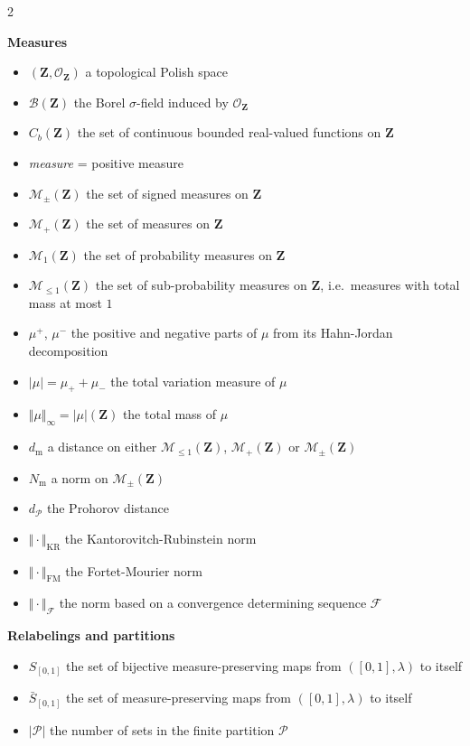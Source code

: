 \documentclass{amsart}
\newcommand{\ie}{i.e.\ }
\theoremstyle{plain}
\theoremstyle{definition}
\newcommand{\Space}{\mathbf{Z}}
\newcommand{\Topo}{\mathcal{O}_\Space}
\newcommand{\Borel}{\mathcal{B}(\Space)}
\newcommand{\cP}{\mathcal{P}}
\newcommand{\Proba}{\mathcal{M}_1(\Space)}
\newcommand{\SubProba}{\mathcal{M}_{\leq1}(\Space)}
\newcommand{\Meas}{\mathcal{M}_+(\Space)}
\newcommand{\SignedMeas}{\mathcal{M}_{\pm}(\Space)}
\newcommand{\CbFunct}{C_b(\Space)}
\newcommand{\TM}[1]{\norm{#1}_\infty}
\newcommand{\InvRelabel}{S_{[0,1]}}
\newcommand{\Relabel}{\bar{S}_{[0,1]}}
\newcommand{\m}{\mathrm{m}}
\newcommand{\dmeas}{d_\m}
\newcommand{\NmeasSymbol}{N_\m}
\newcommand{\NmeasFSymbol}{\Vert\cdot\Vert_{\mathcal{F}}}
\newcommand{\F}{\mathcal{F}}
\newcommand{\dmeasP}{d_{\mathcal{P}}}
\newcommand{\mKR}{\text{KR}}
\newcommand{\NmeasKRSymbol}{\Vert\cdot\Vert_{\mKR}}
\newcommand{\mFM}{\text{FM}}
\newcommand{\NmeasFMSymbol}{\Vert\cdot\Vert_{\mFM}}
\newcommand{\norm}[1]{\Vert#1\Vert}
\begin{document}
\renewcommand\labelitemi{-}
\setlength{\columnseprule}{1pt}
\begin{multicols}{2}
\noindent
\hrulefill

\begin{center}
   \textbf{Measures}
\end{center}
\begin{itemize}[leftmargin=*,itemsep=0.5em]
\item $(\Space, \Topo)$ a topological Polish space
\item $\Borel$ the Borel $\sigma$-field induced by $\Topo$
\item $\CbFunct$ the set of continuous bounded real-valued functions on $\Space$
\item \emph{measure} = positive measure
\item $\SignedMeas$ the set of signed measures on $\Space$
\item $\Meas$ the set of  measures on $\Space$
\item $\Proba$ the set of probability measures on $\Space$
\item $\SubProba$ the set of sub-probability measures on $\Space$,
	\ie measures with total mass at most $1$
\item $\mu^+$, $\mu^-$ the positive and negative parts of $\mu$
	from its Hahn-Jordan decomposition
\item $\vert\mu\vert = \mu_+ + \mu_-$ the total variation measure of $\mu$
\item $\TM{\mu} = \vert\mu\vert(\Space)$ the total mass of $\mu$
\item $\dmeas$ a distance on either $\SubProba$, $\Meas$ or $\SignedMeas$
\item $\NmeasSymbol$ a norm on $\SignedMeas$
\item $\dmeasP$ the Prohorov distance
\item $\NmeasKRSymbol$ the Kantorovitch-Rubinstein norm
\item $\NmeasFMSymbol$ the Fortet-Mourier norm
\item $\NmeasFSymbol$ the norm based on a convergence determining sequence $\F$
\end{itemize}


  \hrulefill
  \begin{center}
   \textbf{Relabelings and partitions}
\end{center}

\begin{itemize}[leftmargin=*,itemsep=0.5em]
\item $\InvRelabel$ the set of bijective 
	measure-preserving maps from $([0,1],\lambda)$ to itself
\item $\Relabel$ the set of measure-preserving maps from $([0,1],\lambda)$ to itself
\item $\vert \cP\vert$ the number of sets in the finite partition $\cP$
\end{itemize}


\end{multicols}
\end{document}
